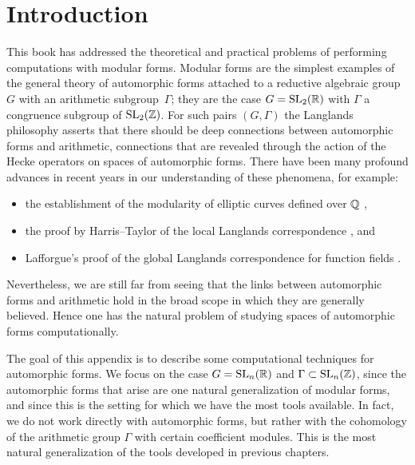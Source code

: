 \section{Introduction}\label{introduction}
%
This book has addressed the theoretical and practical problems of
performing computations with modular forms.  Modular forms are the
simplest examples of the general theory of automorphic forms attached
to a reductive algebraic group $G$ with an arithmetic
subgroup~$\Gamma$; they are the case $G=\operatorname{SL}_{2} (\mathbb{R})$ with $\Gamma$ a
congruence subgroup of $\operatorname{SL}_{2} (\mathbb{Z})$.  For such pairs $(G,\Gamma)$
the Langlands philosophy asserts that there should be deep connections
between automorphic forms and arithmetic, connections that are
revealed through the action of the Hecke operators on spaces of
automorphic forms.  There have been many profound advances in recent
years in our understanding of these phenomena, for example:
\begin{itemize}
\item the establishment of the modularity of
elliptic curves defined over $\mathbb{Q}$ \cite{wiles:fermat, taylor-wiles:fermat, diamond,
cdt, breuil-conrad-diamond-taylor}, 
\item the proof by Harris--Taylor of the local Langlands
correspondence \cite{harris.taylor}, and  
\item Lafforgue's proof of the
global Langlands correspondence for function fields \cite{lafforgue}.
\end{itemize}
Nevertheless, we are still far from seeing that the links between
automorphic forms and arithmetic hold in the broad scope in which 
they are generally believed.  Hence one has the natural problem of
studying spaces of automorphic forms computationally.

%
The goal of this appendix is to describe some computational techniques
for automorphic forms.  We focus on the case $G= \operatorname{SL}_{n} (\mathbb{R})$ and
$\Gamma \subset \operatorname{SL}_{n} (\mathbb{Z})$, since the automorphic forms that arise
are one natural generalization of modular forms, and since this is the
setting for which we have the most tools available.  In fact, we do not
work directly with automorphic forms, but rather with the cohomology
of the arithmetic group $\Gamma$ with certain coefficient modules.
This is the most natural generalization of the tools developed in
previous chapters.


